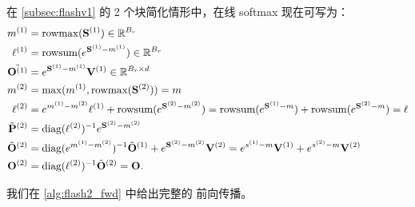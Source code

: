 在 \cref{subsec:flashv1} 的 2 个块简化情形中，在线 softmax 现在可写为：
\begin{align*}
  m^{(1)} &= \mathrm{rowmax}(\mathbf{S}^{(1)})  \in \mathbb{R}^{B_r}\\
  \ell^{(1)} &= \mathrm{rowsum}(e^{\mathbf{S}^{(1)} - m^{(1)}}) \in \mathbb{R}^{B_r} \\
  \tilde{\mathbf{O}^{(1)}} &= e^{\mathbf{S}^{(1)} - m^{(1)}} \mathbf{V}^{(1)} \in \mathbb{R}^{B_r \times d}\\
  m^{(2)} &= \max(m^{(1)}, \mathrm{rowmax}(\mathbf{S}^{(2)})) = m \\
  \ell^{(2)} &= e^{m^{(1)} - m^{(2)}} \ell^{(1)} + \mathrm{rowsum}(e^{\mathbf{S}^{(2)} - m^{(2)}}) = \mathrm{rowsum}(e^{\mathbf{S}^{(1)} - m}) + \mathrm{rowsum}(e^{\mathbf{S}^{(2)} - m}) = \ell \\
  \tilde{\mathbf{P}}^{(2)} &= \mathrm{diag}(\ell^{(2)})^{-1} e^{\mathbf{S}^{(2)} - m^{(2)}} \\
  \tilde{\mathbf{O}}^{(2)} &= \mathrm{diag}(e^{m^{(1)} - m^{(2)}})^{-1} \tilde{\mathbf{O}}^{(1)} + e^{\mathbf{S}^{(2)} - m^{(2)}} \mathbf{V}^{(2)} = e^{s^{(1)} - m} \mathbf{V}^{(1)} + e^{s^{(2)} - m} \mathbf{V}^{(2)} \\
  \mathbf{O}^{(2)} &= \mathrm{diag}(\ell^{(2)})^{-1} \tilde{\mathbf{O}}^{(2)} = \mathbf{O}.
\end{align*}

我们在 \cref{alg:flash2_fwd} 中给出完整的 \sysname 前向传播。

